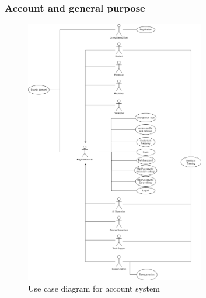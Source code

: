\newpage
\subsubsection{Account and general purpose}
\begin{figure}[h]
	\centering
	\includegraphics[width=0.7\textwidth]{images/UC-account.png}
	\caption{Use case diagram for account system}
	\label{fig:UC-account}
\end{figure}

\newpage
